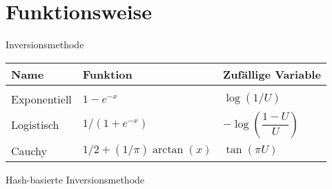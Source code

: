 \section{Funktionsweise}

\begin{frame}{Inversionsmethode}
    \begin{table}%
        \centering
        \begin{tabular}{l|l|l}
        Name         & Funktion & Zufällige Variable \\
        \hline\hline & & \\
        Exponentiell & $1 - e^{-x}$ & $\log(1/U)$  \\
        Logistisch   & $1 / (1 + e^{-x})$ & $-\log(\dfrac{1-U}{U})$   \\
        Cauchy       & $1/2 + (1/\pi) \arctan(x)$ & $\tan(\pi U)$
        \end{tabular}
    \end{table}
\end{frame}

\begin{frame}{Hash-basierte Inversionsmethode}
    
\end{frame}